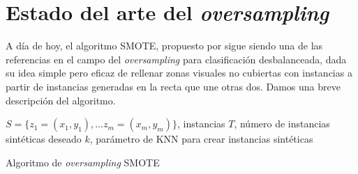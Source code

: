 
\section{Estado del arte del \textit{oversampling}}
A día de hoy, el algoritmo SMOTE, propuesto por \citealt{chawla02} sigue siendo una de las referencias en el campo del 
\textit{oversampling} para clasificación desbalanceada, dada su idea simple pero eficaz de rellenar zonas visuales no 
cubiertas con instancias a partir de instancias generadas en la recta que une otras dos. Damos una breve descripción
del algoritmo.

\begin{algorithm}[H]
\begin{algorithmic}[1]
  \REQUIRE $S = \{z_1 = (x_1,y_1), \ldots z_m = (x_m,y_m)\}$, instancias
  \REQUIRE $T$, número de instancias sintéticas deseado
  \REQUIRE $k$, parámetro de KNN para crear instancias sintéticas
  \NEWLINE
    \ENDFOR
  \ENDFOR
  \NEWLINE
\end{algorithmic}
\caption{Algoritmo de \textit{oversampling} SMOTE}
\label{alg:smote}
\end{algorithm}
